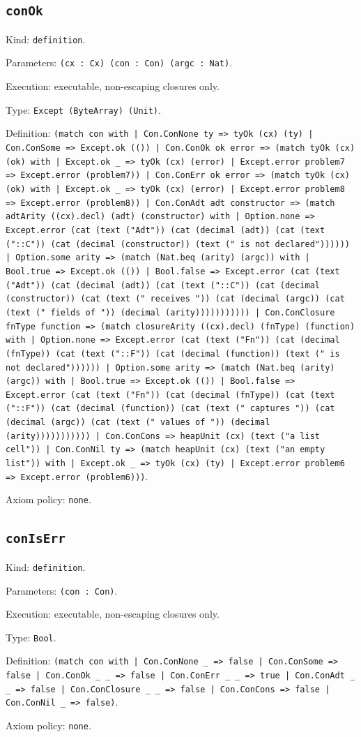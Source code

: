 \documentclass[11pt]{article}
\begin{document}
\subsection*{\texttt{conOk}}
\noindent Kind: \texttt{definition}.\par
\noindent Parameters: \texttt{(cx : Cx) (con : Con) (argc : Nat)}.\par
\noindent Execution: executable, non-escaping closures only.\par
\noindent Type: \texttt{Except (ByteArray) (Unit)}.\par
\noindent Definition: \texttt{(match con with | Con.ConNone ty => tyOk (cx) (ty) | Con.ConSome => Except.ok (()) | Con.ConOk ok error => (match tyOk (cx) (ok) with | Except.ok \_ => tyOk (cx) (error) | Except.error problem7 => Except.error (problem7)) | Con.ConErr ok error => (match tyOk (cx) (ok) with | Except.ok \_ => tyOk (cx) (error) | Except.error problem8 => Except.error (problem8)) | Con.ConAdt adt constructor => (match adtArity ((cx).decl) (adt) (constructor) with | Option.none => Except.error (cat (text ("Adt")) (cat (decimal (adt)) (cat (text ("::C")) (cat (decimal (constructor)) (text (" is not declared")))))) | Option.some arity => (match (Nat.beq (arity) (argc)) with | Bool.true => Except.ok (()) | Bool.false => Except.error (cat (text ("Adt")) (cat (decimal (adt)) (cat (text ("::C")) (cat (decimal (constructor)) (cat (text (" receives ")) (cat (decimal (argc)) (cat (text (" fields of ")) (decimal (arity))))))))))) | Con.ConClosure fnType function => (match closureArity ((cx).decl) (fnType) (function) with | Option.none => Except.error (cat (text ("Fn")) (cat (decimal (fnType)) (cat (text ("::F")) (cat (decimal (function)) (text (" is not declared")))))) | Option.some arity => (match (Nat.beq (arity) (argc)) with | Bool.true => Except.ok (()) | Bool.false => Except.error (cat (text ("Fn")) (cat (decimal (fnType)) (cat (text ("::F")) (cat (decimal (function)) (cat (text (" captures ")) (cat (decimal (argc)) (cat (text (" values of ")) (decimal (arity))))))))))) | Con.ConCons => heapUnit (cx) (text ("a list cell")) | Con.ConNil ty => (match heapUnit (cx) (text ("an empty list")) with | Except.ok \_ => tyOk (cx) (ty) | Except.error problem6 => Except.error (problem6)))}.\par
\noindent Axiom policy: \texttt{none}.\par
\subsection*{\texttt{conIsErr}}
\noindent Kind: \texttt{definition}.\par
\noindent Parameters: \texttt{(con : Con)}.\par
\noindent Execution: executable, non-escaping closures only.\par
\noindent Type: \texttt{Bool}.\par
\noindent Definition: \texttt{(match con with | Con.ConNone \_ => false | Con.ConSome => false | Con.ConOk \_ \_ => false | Con.ConErr \_ \_ => true | Con.ConAdt \_ \_ => false | Con.ConClosure \_ \_ => false | Con.ConCons => false | Con.ConNil \_ => false)}.\par
\noindent Axiom policy: \texttt{none}.\par
\end{document}
